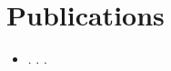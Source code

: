 \documentclass[10pt,a4paper]{article}
\begin{document}
\section{Publications}
\begin{itemize}[leftmargin=0.45em, label={--}, itemsep=1pt, parsep=0pt, topsep=2pt]
    \item \small \textbf{}. \textit{}. .
\end{itemize}
\end{document}

